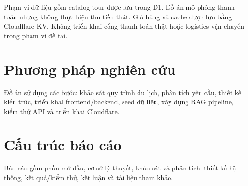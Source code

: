 Phạm vi dữ liệu gồm catalog tour được lưu trong D1. Đồ án mô phỏng thanh toán nhưng không thực hiện thu tiền thật. Giỏ hàng và cache được lưu bằng Cloudflare KV. Không triển khai cổng thanh toán thật hoặc logistics vận chuyển trong phạm vi đề tài.

\section*{Phương pháp nghiên cứu}
Đồ án sử dụng các bước: khảo sát quy trình du lịch, phân tích yêu cầu, thiết kế kiến trúc, triển khai frontend/backend, seed dữ liệu, xây dựng RAG pipeline, kiểm thử API và triển khai Cloudflare.

\section*{Cấu trúc báo cáo}
Báo cáo gồm phần mở đầu, cơ sở lý thuyết, khảo sát và phân tích, thiết kế hệ thống, kết quả/kiểm thử, kết luận và tài liệu tham khảo.
